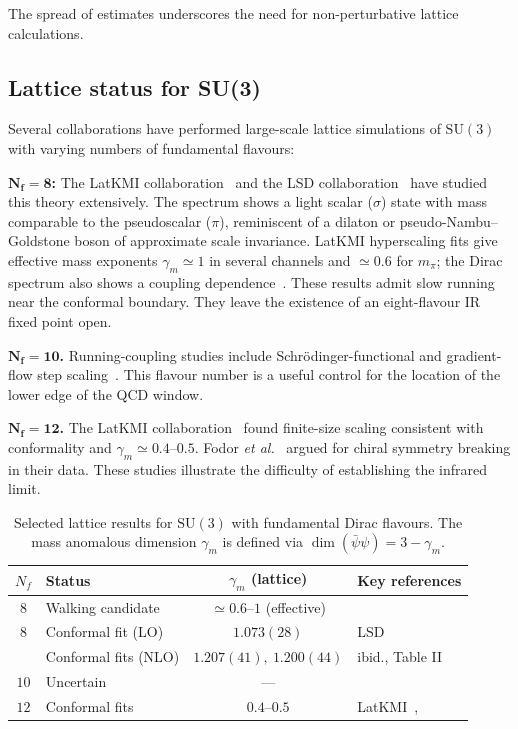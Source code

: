 \documentclass[11pt,a4paper]{article}
\theoremstyle{plain}
\theoremstyle{definition}
\theoremstyle{remark}
\newcommand{\Nf}{N_{\!f}}
\newcommand{\SU}[1]{\mathrm{SU}(#1)}
\begin{document}
The spread of estimates underscores the need for non-perturbative
lattice calculations.

\subsection{Lattice status for SU(3)}
\label{ssec:lattice-status}

Several collaborations have performed large-scale lattice simulations
of $\SU{3}$ with varying numbers of fundamental flavours:

\textbf{$\boldsymbol{\Nf = 8}$:}  The LatKMI
collaboration~\cite{LatKMI2014_Nf8} and the LSD
collaboration~\cite{LSD2014_Nf8} have studied this theory extensively.
The spectrum shows a light scalar ($\sigma$) state with mass comparable
to the pseudoscalar ($\pi$), reminiscent of a dilaton or
pseudo-Nambu--Goldstone boson of approximate scale invariance.
LatKMI hyperscaling fits give effective mass exponents
$\gamma_m\simeq 1$ in several channels and $\simeq 0.6$ for $m_\pi$;
the Dirac spectrum also shows a coupling dependence~\cite{LatKMI2017_Nf8,Cheng2013}.
These results admit slow running near the conformal boundary.  They
leave the existence of an eight-flavour IR fixed point open.

\textbf{$\boldsymbol{\Nf = 10}$.}  Running-coupling studies include
Schr\"odinger-functional and gradient-flow step
scaling~\cite{Hayakawa2011,HRW2020}.  This flavour number is a useful
control for the location of the lower edge of the QCD window.

\textbf{$\boldsymbol{\Nf = 12}$.}  The LatKMI
collaboration~\cite{LatKMI2012_Nf12} found finite-size scaling
consistent with conformality and $\gamma_m\simeq0.4$--$0.5$.
Fodor \textit{et al.}~\cite{Fodor2012} argued for chiral symmetry
breaking in their data.  These studies illustrate the difficulty of
establishing the infrared limit.

\begin{table}[ht]
\centering
\renewcommand{\arraystretch}{1.3}
\caption{Selected lattice results for $\SU{3}$ with fundamental Dirac
  flavours.  The mass anomalous dimension $\gamma_m$ is defined via
  $\dim(\bar\psi\psi) = 3 - \gamma_m$.}
\label{tab:lattice-status}
\begin{tabular}{@{} c l c l @{}}
\toprule
$\Nf$ & Status & $\gamma_m$ (lattice) & Key references \\
\midrule
$8$  & Walking candidate & $\simeq 0.6$--$1$ (effective) &
  \cite{LatKMI2017_Nf8,Cheng2013} \\
$8$ & Conformal fit (LO) & $1.073(28)$ & LSD~\cite{LSD2023dilaton} \\
    & Conformal fits (NLO) & $1.207(41),\ 1.200(44)$ & ibid., Table II \\
$10$ & Uncertain & --- &
  \cite{Hayakawa2011} \\
$12$ & Conformal fits & $0.4$--$0.5$ &
  LatKMI~\cite{LatKMI2012_Nf12}, \cite{Fodor2012} \\
\bottomrule
\end{tabular}
\end{table}
\end{document}
